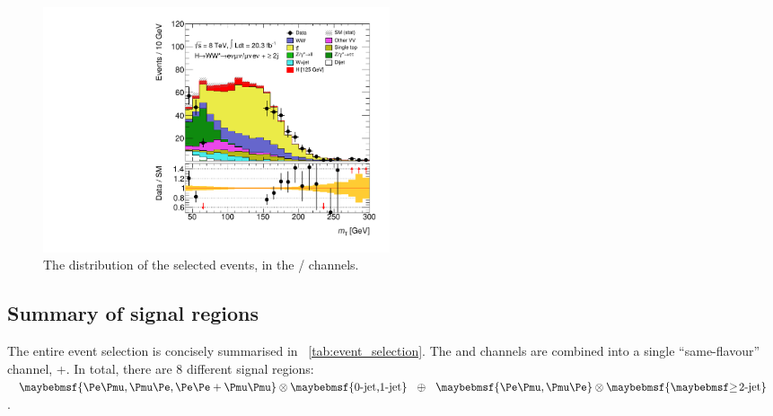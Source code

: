 \begin{figure}[t]
	\includegraphics[width=0.495\textwidth]{tex/selection/emme_CutFailVBFTopoDPhillggFlike_2jetincl_MT_TrackHWW_Clj_mh125_lin}
	\caption{The \mt distribution of the selected \twojet events, in the \emch/\mech 
	channels.}
	\label{fig:sel:2j:mt}
\end{figure}



\subsection{Summary of signal regions}
\label{sec:selection:summary}

The entire event selection is concisely summarised in \Table~\ref{tab:event_selection}. The 
\eech and \mmch channels are combined into a single ``same-flavour'' channel, \eech{}+\mmch.
In total, there are 8 different signal regions: $\braces{\emch,\mech,\eech{}+\mmch} 
\otimes \braces{\text{0-jet,1-jet}}~~\oplus~~\braces{\emch,\mech} \otimes \braces{\twojet}$. 

